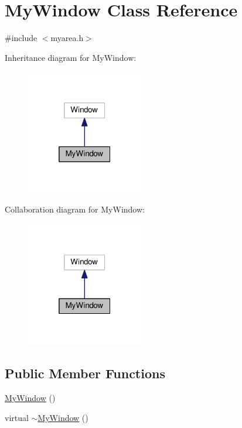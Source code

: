 \hypertarget{class_my_window}{}\section{My\+Window Class Reference}
\label{class_my_window}


{\ttfamily \#include $<$myarea.\+h$>$}



Inheritance diagram for My\+Window\+:
\nopagebreak
\begin{figure}[H]
\begin{center}
\leavevmode
\includegraphics[width=145pt]{class_my_window__inherit__graph}
\end{center}
\end{figure}


Collaboration diagram for My\+Window\+:
\nopagebreak
\begin{figure}[H]
\begin{center}
\leavevmode
\includegraphics[width=145pt]{class_my_window__coll__graph}
\end{center}
\end{figure}
\subsection*{Public Member Functions}
\begin{DoxyCompactItemize}
\item 
\hyperlink{class_my_window_ae0ae4de3a21d55202f428bd6bf5656d9}{My\+Window} ()
\item 
virtual \hyperlink{class_my_window_acc6b33f79cb9f1ee9107beac4c474fd3}{$\sim$\+My\+Window} ()
\end{DoxyCompactItemize}
